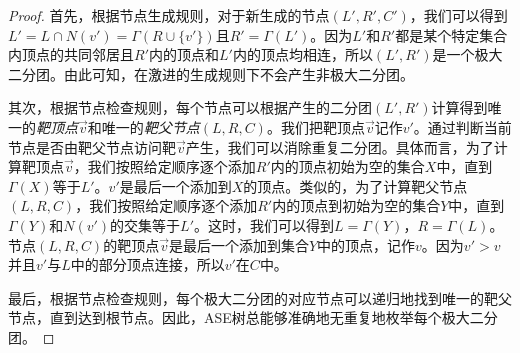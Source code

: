 \begin{proof}
  首先，根据节点生成规则，对于新生成的节点$(L',R',C')$，我们可以得到$L'=L\cap N(v')=\Gamma(R\cup\{v'\})$且$R'=\Gamma(L')$。因为$L'$和$R'$都是某个特定集合内顶点的共同邻居且$R'$内的顶点和$L'$内的顶点均相连，所以$(L',R')$是一个极大二分团。由此可知，在激进的生成规则下不会产生非极大二分团。

  其次，根据节点检查规则，每个节点可以根据产生的二分团$(L',R')$计算得到唯一的\emph{靶顶点$\vec{v}$}和唯一的\emph{靶父节点}$(L,R,C)$。我们把靶顶点$\vec{v}$记作$v'$。通过判断当前节点是否由靶父节点访问靶$\vec{v}$产生，我们可以消除重复二分团。具体而言，为了计算靶顶点$\vec{v}$，我们按照给定顺序逐个添加$R'$内的顶点初始为空的集合$X$中，直到$\Gamma(X)$等于$L'$。$v'$是最后一个添加到$X$的顶点。类似的，为了计算靶父节点$(L,R,C)$，我们按照给定顺序逐个添加$R'$内的顶点到初始为空的集合$Y$中，直到$\Gamma(Y)$和$N(v')$的交集等于$L'$。这时，我们可以得到$L=\Gamma(Y)$，$R=\Gamma(L)$。节点$(L,R,C)$的靶顶点$\vec{v}$是最后一个添加到集合$Y$中的顶点，记作$v$。因为$v'>v$并且$v'$与$L$中的部分顶点连接，所以$v'$在$C$中。
  
  最后，根据节点检查规则，每个极大二分团的对应节点可以递归地找到唯一的靶父节点，直到达到根节点。因此，ASE树总能够准确地无重复地枚举每个极大二分团。
\end{proof}









